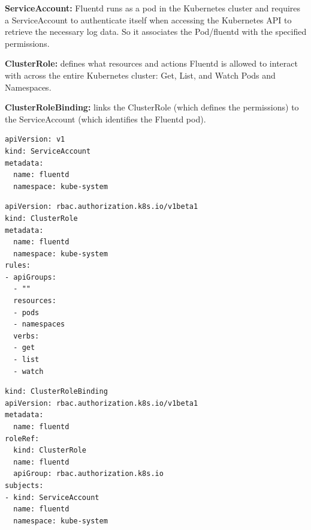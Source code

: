 \documentclass{article}
\newenvironment{codetemplate}[1][]{%
  \mybasecolorbox[#1]
  \itshape
}{%
  \endmybasecolorbox
}
\begin{document}
\textbf{ServiceAccount:} Fluentd runs as a pod in the Kubernetes cluster and requires a ServiceAccount to authenticate itself when accessing the Kubernetes API to retrieve the necessary log data. So it associates the Pod/fluentd with the specified permissions.

\textbf{ClusterRole:} defines what resources and actions Fluentd is allowed to interact with across the entire Kubernetes cluster: Get, List, and Watch Pods and Namespaces.

\textbf{ClusterRoleBinding:} links the ClusterRole (which defines the permissions) to the ServiceAccount (which identifies the Fluentd pod).

\begin{codetemplate}{}
\begin{verbatim}
apiVersion: v1
kind: ServiceAccount
metadata:
  name: fluentd
  namespace: kube-system
\end{verbatim}
\end{codetemplate}
\begin{codetemplate}{}
\begin{verbatim}
apiVersion: rbac.authorization.k8s.io/v1beta1
kind: ClusterRole
metadata:
  name: fluentd
  namespace: kube-system
rules:
- apiGroups:
  - ""
  resources:
  - pods
  - namespaces
  verbs:
  - get
  - list
  - watch
\end{verbatim}
\end{codetemplate}
\begin{codetemplate}{}
\begin{verbatim}
kind: ClusterRoleBinding
apiVersion: rbac.authorization.k8s.io/v1beta1
metadata:
  name: fluentd
roleRef:
  kind: ClusterRole
  name: fluentd
  apiGroup: rbac.authorization.k8s.io
subjects:
- kind: ServiceAccount
  name: fluentd
  namespace: kube-system
\end{verbatim}
\end{codetemplate}
\end{document}
